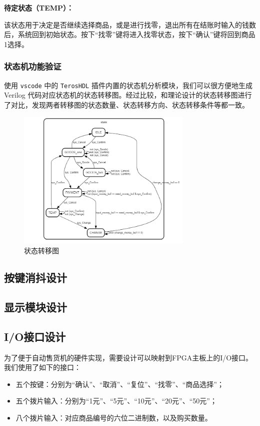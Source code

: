 \documentclass[12pt]{SEU-Circuit-Report}
\begin{document}
    \textbf{待定状态（TEMP）：}

    该状态用于决定是否继续选择商品，或是进行找零，退出所有在结账时输入的钱数后，系统回到初始状态。按下“找零”键将进入找零状态，按下“确认”键将回到商品1选择。
    \subsubsection{状态机功能验证}
    使用 \texttt{vscode} 中的 \texttt{TerosHDL} 插件内置的状态机分析模块，我们可以很方便地生成 Verilog 代码对应状态机的状态转移图。经过比较，和理论设计的状态转移图进行了对比，发现两者转移图的状态数量、状态转移方向、状态转移条件等都一致。
    \begin{figure}[htbp]
        \centering
        \includegraphics[width=0.75\textwidth]{fig/generatedFlowchart.png}
        \caption{状态转移图}
    \end{figure}

    \subsection{按键消抖设计}
    \subsection{显示模块设计}
    \subsection{I/O接口设计}
    为了便于自动售货机的硬件实现，需要设计可以映射到FPGA主板上的I/O接口。我们使用了如下的接口：
    \begin{itemize}
        \item 五个按键：分别为“确认”、“取消”、“复位”、“找零”、“商品选择”；
        \item 五个拨片输入：分别为“1元”、“5元”、“10元”、“20元”、“50元”；
        \item 八个拨片输入：对应商品编号的六位二进制数，以及购买数量。
    \end{itemize}
\end{document}
